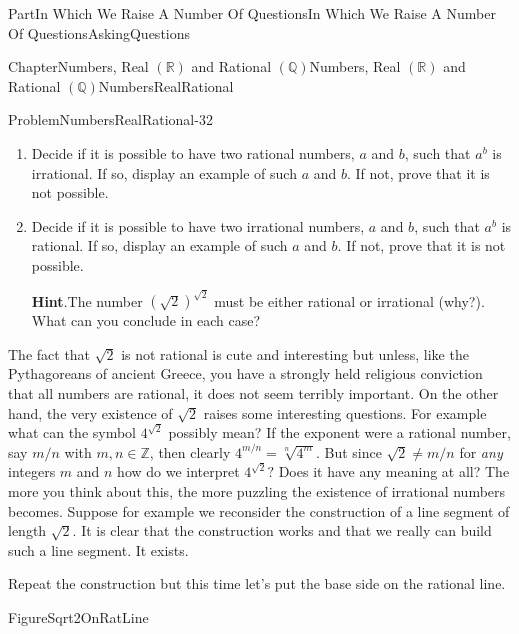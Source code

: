 \documentclass[oneside,10pt,]{book}
\newcommand{\blocktitlefont}{\relax}
\numberwithin{equation}{part}
\newcommand{\RR}{\mathbb {R}}
\newcommand{\QQ}{\mathbb {Q}}
\newcommand{\ZZ}{\mathbb {Z}}
\begin{document}
\begin{partptx}{Part}{In Which We Raise A Number Of Questions}{}{In Which We Raise A Number Of Questions}{}{}{AskingQuestions}
\begin{chapterptx}{Chapter}{Numbers, Real \(\left(\RR\right)\) and Rational \(\left(\QQ\right)\)}{}{Numbers, Real \(\left(\RR\right)\) and Rational \(\left(\QQ\right)\)}{}{}{NumbersRealRational}
\begin{problem}{Problem}{}{NumbersRealRational-32}
\begin{enumerate}[font=\bfseries,label=(\alph*),ref=\alph*]
\item{}Decide if it is  possible to have two rational numbers, \(a\) and \(b\), such that \(a^b\) is irrational. If so, display an example of such \(a\) and \(b\). If not, prove that it is not possible.%
\item{}Decide if it is possible to have two irrational numbers, \(a\) and \(b\), such that \(a^b\) is rational. If so, display an example of such \(a\) and \(b\). If not, prove that it is not possible.%
\par\smallskip%
\noindent\textbf{\blocktitlefont Hint}.\hypertarget{NumbersRealRational-32-5-2}{}\quad{}The number \(\left( \sqrt{2}\right)^{\sqrt{2}}\) must be either rational or irrational (why?). What can you conclude in each case?%
\end{enumerate}%
\end{problem}
 The fact that \(\sqrt{2}\) is not rational is cute and interesting but unless, like the Pythagoreans of ancient Greece, you have a strongly held religious conviction that all numbers are rational, it does not seem terribly important.  On the other hand, the very existence of \(\sqrt{2}\) raises some interesting questions.  For example what can the symbol \(4^{\sqrt{2}}\) possibly mean?  If the exponent were a rational number, say \(m/n\) with \(m, n \in \ZZ\), then clearly \(4^{m/n}=\sqrt[n]{4^m}\).  But since \(\sqrt{2}\neq m/n\) for \emph{any} integers \(m\) and \(n\) how do we interpret \(4^{\sqrt{2}}?\) Does it have any meaning at all? The more you think about this, the more puzzling the existence of irrational numbers becomes.  Suppose for example we reconsider the construction of a line segment of length \(\sqrt{2}\).  It is clear that the construction works and that we really can build such a line segment.  It exists.%
\par
Repeat the construction but this time let's put the base side on the rational line.%
\begin{figureptx}{Figure}{}{Sqrt2OnRatLine}{}%
\begin{image}{0.25}{0.5}{0.25}{}%

\end{image}
\end{figureptx}
\end{chapterptx}
\end{partptx}
\end{document}
